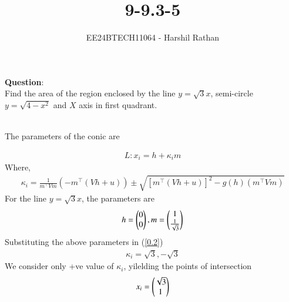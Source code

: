 \documentclass[journal]{IEEEtran}
\begin{document}

\vspace{3cm}

\title{9-9.3-5}
\author{EE24BTECH11064 - Harshil Rathan}
{\let\newpage\relax\maketitle}

\renewcommand{\thefigure}{\theenumi}
\renewcommand{\thetable}{\theenumi}
\setlength{\intextsep}{10pt} %


\renewcommand{\thetable}{\theenumi}
\textbf{Question}:\\
Find the area of the region enclosed by the line $y=\sqrt{3}x$, semi-circle $y=\sqrt{4-x^2}$ and $X$ axis in first quadrant.\\
\solution \\
\begin{table}[h!]
    \centering
    
\end{table}
The parameters of the conic are\\
\begin{table}[h!]
    \centering
    
    \label{Table2}
\end{table}
\begin{align}
    L : x_i=h+\kappa_i m 
\end{align}
Where,
\begin{align}
    \kappa_i=\frac{1}{m^\top Vm}(-m^\top(Vh+u)) \pm \sqrt{[m^\top(Vh+u)]^2-g(h)(m^\top Vm)}
    \label{0.2}
\end{align}
For the line $y=\sqrt{3}x$, the parameters are\\
\begin{align}    
    h=\begin{pmatrix}0\\0\end{pmatrix} , m=\begin{pmatrix}1\\ \frac{1}{\sqrt{3}}\end{pmatrix}
\end{align}
Substituting the above parameters in (\ref{0.2})\\
\begin{align}
    \kappa_i= \sqrt{3},-\sqrt{3}
\end{align}
We consider only +ve value of $\kappa_i$, yilelding the points of intersection\\
\begin{align}
  x_i=\begin{pmatrix}\sqrt{3} \\ 1\end{pmatrix}
\end{align}
\end{document}
